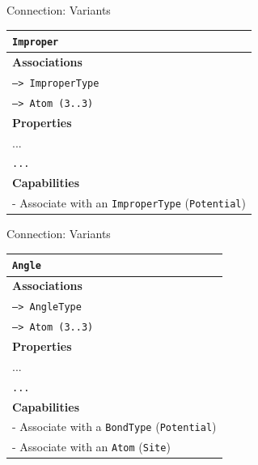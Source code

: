 \documentclass[xcolor=table]{beamer}
\begin{document}
\begin{frame}{Connection: Variants}
\begin{table}[ht]
    \centering
    \label{tab:ExampleConnections}

 \begin{tabular}{|l|}

         \hline
         \rowcolor{gray!50}
         \texttt{Improper}  \\
         \hline
         \textbf{Associations} \\
         \hline
         \texttt{--> ImproperType}\\
         \texttt{--> Atom (3..3)}\\
         \textbf{Properties}\\
         \hline
            ...\\
             \texttt{...}\\
         \hline
         \textbf{Capabilities}\\
         \hline
         - Associate with an \texttt{ImproperType} (\texttt{Potential})\\
        \hline
    \end{tabular}
\end{table}

\end{frame}

\begin{frame}{Connection: Variants}
\begin{table}[ht]
    \centering
    \label{tab:ExampleConnections}

\begin{tabular}{|l|}
         \hline
         \rowcolor{gray!50}
         \texttt{Angle}  \\
         \hline
         \textbf{Associations} \\
         \hline
         \texttt{--> AngleType}\\
          \texttt{--> Atom (3..3)}\\

         \textbf{Properties}\\
         \hline
            ...\\
         \texttt{...}\\
         \hline
         \textbf{Capabilities}\\
         \hline
         - Associate with a \texttt{BondType} (\texttt{Potential})\\
         - Associate with an \texttt{Atom} (\texttt{Site})\\
        \hline
    \end{tabular}
\end{table}

\end{frame}
\end{document}

